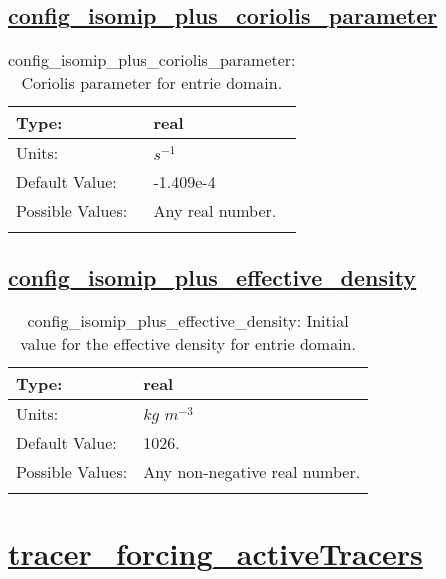 \subsection[config\_isomip\_plus\_coriolis\_parameter]{\hyperref[sec:nm_tab_isomip_plus]{config\_isomip\_plus\_coriolis\_parameter}}
\label{subsec:nm_sec_config_isomip_plus_coriolis_parameter}
\begin{center}
\begin{longtable}{| p{2.0in} || p{4.0in} |}
    \hline
    Type: & real \\
    \hline
    Units: & $s^{-1}$ \\
    \hline
    Default Value: & -1.409e-4 \\
    \hline
    Possible Values: & Any real number. \\
    \hline
    \caption{config\_isomip\_plus\_coriolis\_parameter: Coriolis parameter for entrie domain.}
\end{longtable}
\end{center}
\subsection[config\_isomip\_plus\_effective\_density]{\hyperref[sec:nm_tab_isomip_plus]{config\_isomip\_plus\_effective\_density}}
\label{subsec:nm_sec_config_isomip_plus_effective_density}
\begin{center}
\begin{longtable}{| p{2.0in} || p{4.0in} |}
    \hline
    Type: & real \\
    \hline
    Units: & $kg$ $m^{-3}$ \\
    \hline
    Default Value: & 1026. \\
    \hline
    Possible Values: & Any non-negative real number. \\
    \hline
    \caption{config\_isomip\_plus\_effective\_density: Initial value for the effective density for entrie domain.}
\end{longtable}
\end{center}
\section[tracer\_forcing\_activeTracers]{\hyperref[sec:nm_tab_tracer_forcing_activeTracers]{tracer\_forcing\_activeTracers}}
\label{sec:nm_sec_tracer_forcing_activeTracers}
